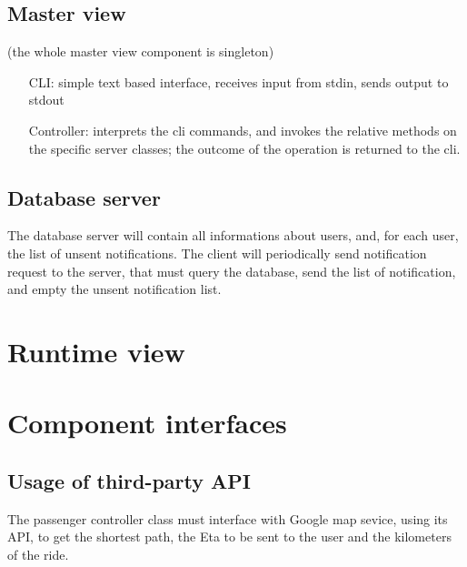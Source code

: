 	\subsection{Master view}
	(the whole master view component is singleton)
	\begin{itemize}
	  \item [CLI:] simple text based interface, receives input from stdin, sends output to stdout
	  \item [Controller:] interprets the cli commands, and invokes the relative methods on the specific server classes;
	  the outcome of the operation is returned to the cli.
	\end{itemize}
	\subsection{Database server}
	The database server will contain all informations about users, and, for each user, the list of unsent notifications.
	The client will periodically send notification request to the server, that must query the database, send the list of notification,
	and empty the unsent notification list.
\section{Runtime view}

\section{Component interfaces}

\subsection{Usage of third-party API}
The passenger controller class must interface with Google map sevice, using its API, to get the shortest path, the Eta to be sent to the user and the 
kilometers of the ride.

